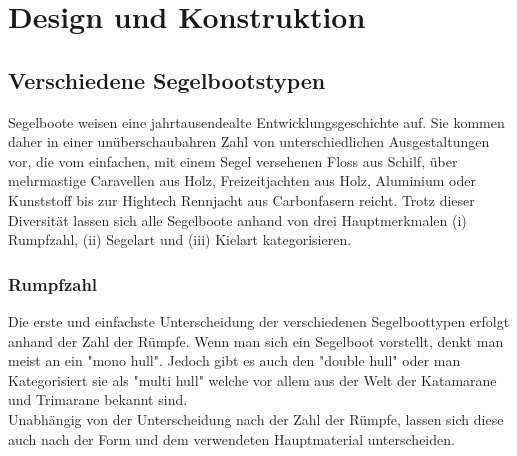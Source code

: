 


\label{chap:konstruktion}
\chapter{Design und Konstruktion}
\section{Verschiedene Segelbootstypen}
Segelboote weisen eine jahrtausendealte Entwicklungsgeschichte auf. Sie kommen daher in einer unüberschaubahren Zahl von unterschiedlichen Ausgestaltungen vor, die vom einfachen, mit einem Segel versehenen Floss aus Schilf, über mehrmastige Caravellen aus Holz, Freizeitjachten aus Holz, Aluminium oder Kunststoff  bis zur Hightech Rennjacht aus Carbonfasern reicht. Trotz dieser Diversität lassen sich alle Segelboote anhand von drei Hauptmerkmalen (i) Rumpfzahl, (ii) Segelart und (iii) Kielart kategorisieren.\\
\subsection{Rumpfzahl}
Die erste und einfachste Unterscheidung der verschiedenen Segelboottypen erfolgt anhand der Zahl der Rümpfe. Wenn man sich ein Segelboot vorstellt, denkt man meist an ein "mono hull". Jedoch gibt es auch den "double hull" oder man Kategorisiert sie als "multi hull" welche vor allem aus der Welt der Katamarane und Trimarane bekannt sind.\\
Unabhängig von der Unterscheidung nach der Zahl der Rümpfe, lassen sich diese auch nach der Form und dem verwendeten Hauptmaterial unterscheiden.
